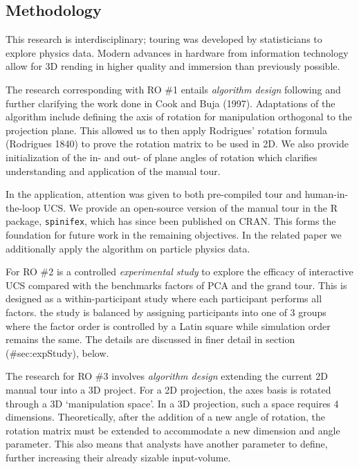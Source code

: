 \documentclass[
  11,
]{article}
\begin{document}
\hypertarget{methodology}{%
\subsection{Methodology}\label{methodology}}

This research is interdisciplinary; touring was developed by statisticians to explore physics data. Modern advances in hardware from information technology allow for 3D rending in higher quality and immersion than previously possible.

The research corresponding with RO \#1 entails \emph{algorithm design} following and further clarifying the work done in Cook and Buja (1997). Adaptations of the algorithm include defining the axis of rotation for manipulation orthogonal to the projection plane. This allowed us to then apply Rodrigues' rotation formula (Rodrigues 1840) to prove the rotation matrix to be used in 2D. We also provide initialization of the in- and out- of plane angles of rotation which clarifies understanding and application of the manual tour.

In the application, attention was given to both pre-compiled tour and human-in-the-loop UCS. We provide an open-source version of the manual tour in the R package, \texttt{spinifex}, which has since been published on CRAN. This forms the foundation for future work in the remaining objectives. In the related paper we additionally apply the algorithm on particle physics data.

For RO \#2 is a controlled \emph{experimental study} to explore the efficacy of interactive UCS compared with the benchmarks factors of PCA and the grand tour. This is designed as a within-participant study where each participant performs all factors. the study is balanced by assigning participants into one of 3 groups where the factor order is controlled by a Latin square while simulation order remains the same. The details are discussed in finer detail in section (\#sec:expStudy), below.

The research for RO \#3 involves \emph{algorithm design} extending the current 2D manual tour into a 3D project. For a 2D projection, the axes basis is rotated through a 3D `manipulation space'. In a 3D projection, such a space requires 4 dimensions. Theoretically, after the addition of a new angle of rotation, the rotation matrix must be extended to accommodate a new dimension and angle parameter. This also means that analysts have another parameter to define, further increasing their already sizable input-volume.
\end{document}
